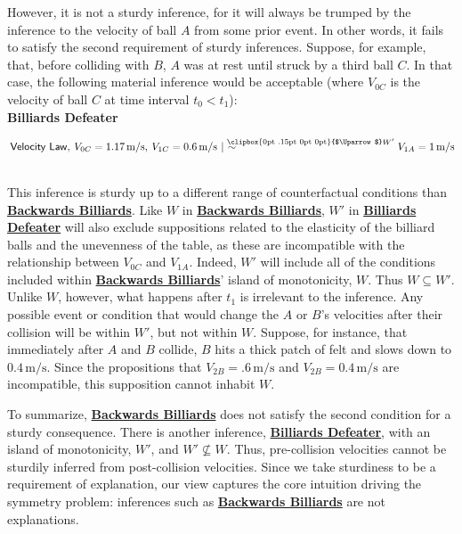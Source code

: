 \documentclass[natbib]{svjour3}                     %
\makeatletter
\newcommand{\Uuparrow}{%
	\raisebox{.2ex}{\clipbox{0pt .15pt 0pt 0pt}{$\Uparrow$}}
}
\newcommand{\nms}{%
	\mathbin{\mathpalette\@nms\expandafter}
}
\newcommand{\@nms}{\mid\joinrel\mkern-.5mu\sim}
\newcommand{\mrc}[1]{\mathbin{
		\mathchoice
		{\normalsize\hspace{.5mm}\nms^{\mkern-19mu\scriptsize\Uuparrow#1}\hspace{-.5mm}}
		{\normalsize\hspace{.5mm}\nms^{\mkern-19mu\scriptsize\Uuparrow#1}\hspace{-.5mm}}
		{\footnotesize\hspace{.5mm}\nms^{\mkern-13.5mu\fontsize{5.5}{0}\Uuparrow#1}}
		{\scriptsize\nms^{\mkern-10mu\tiny\Uuparrow#1}}
	}
}
\makeatother
\begin{document}
However, it is not a sturdy inference, for it will always be trumped by the inference to the velocity of ball $A$ from some prior event. In other words, it fails to satisfy the second requirement of sturdy inferences. Suppose, for example, that, before colliding with $B$, $A$ was at rest until struck by a third ball $C$.  In that case, the following material inference would be acceptable (where $V_{0C}$ is the velocity of ball $C$ at time interval $t_{0} < t_{1}$):\\

\noindent \label{eq:MRC_defeater}\textbf{Billiards Defeater}\hspace{6mm}\begin{minipage}[t]{.8\textwidth}
	$\hspace{.5ex} \mathsf{Velocity\ Law},\hspace{.5ex} V_{0C} = 1.17 \,\text{m/s},\hspace{.5ex} V_{1C} = 0.6\,\text{m/s} \mrc{W'}\, V_{1A} = 1\,\text{m/s}$
\end{minipage}\\ 


\noindent This inference is sturdy up to a different range of counterfactual conditions than \hyperref[eq:MRC_ballsbackwards]{\textbf{Backwards Billiards}}. Like $W$ in \hyperref[eq:MRC_ballsbackwards]{\textbf{Backwards Billiards}}, $W'$ in \hyperref[eq:MRC_defeater]{\textbf{Billiards Defeater}} will also exclude suppositions related to the elasticity of the billiard balls and the unevenness of the table, as these are incompatible with the relationship between $V_{0C}$ and $V_{1A}$. Indeed, $W'$ will include all of the conditions included within  \hyperref[eq:MRC_ballsbackwards]{\textbf{Backwards Billiards}}' island of monotonicity, $W$. Thus $W \subseteq W'$.  Unlike $W$, however, what happens after $t_{1}$ is irrelevant to the inference.  Any possible event or condition that would change the $A$ or $B$'s velocities after their collision will be within $W'$, but not within $W$. Suppose, for instance, that immediately after $A$ and $B$ collide, $B$ hits a thick patch of felt and slows down to $0.4\,\text{m/s}$. Since the propositions that $V_{2B} = .6\,\text{m/s}$ and $V_{2B} = 0.4\,\text{m/s}$ are incompatible, this supposition cannot inhabit $W$.

To summarize, \hyperref[eq:MRC_ballsbackwards]{\textbf{Backwards Billiards}} does not satisfy the second condition for a sturdy consequence.  There is another inference, \hyperref[eq:MRC_defeater]{\textbf{Billiards Defeater}}, with an island of monotonicity, $W'$, and $W'\not\subseteq W$.  Thus, pre-collision velocities cannot be sturdily inferred from post-collision velocities. Since we take sturdiness to be a requirement of explanation, our view captures the core intuition driving the symmetry problem: inferences such as \hyperref[eq:MRC_ballsbackwards]{\textbf{Backwards Billiards}} are not explanations. 
\end{document}

